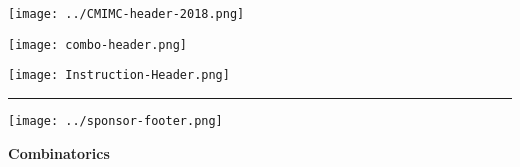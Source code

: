 \documentclass[10pt]{article}
\begin{document}
\thispagestyle{empty}
\begin{center}

\vspace*{40pt}

\texttt{[image: ../CMIMC-header-2018.png]}

\texttt{[image: combo-header.png]}

\vspace{1.4in}

\texttt{[image: Instruction-Header.png]}
\noindent\rule{15.7cm}{2pt}
\end{center}

\vspace{10pt}



\vspace{0.7in}

\begin{center}
\texttt{[image: ../sponsor-footer.png]}
\end{center}
\newpage

\begin{center}
\huge\textbf{Combinatorics}\normalsize

\vspace{3pt}
\end{center}
\end{document}
